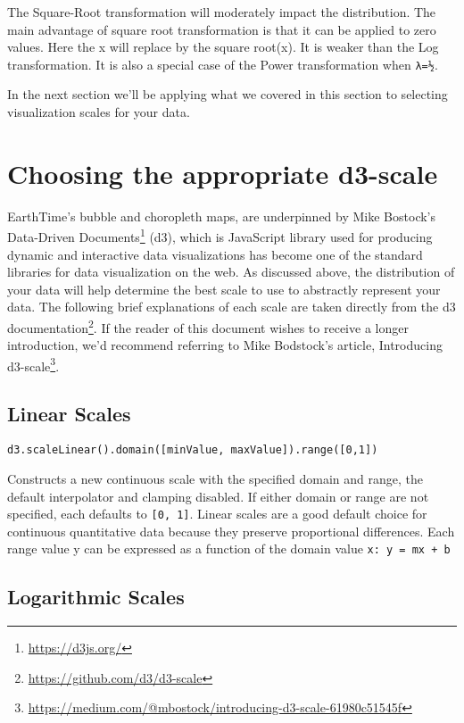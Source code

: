 \documentclass[
]{book}
\renewcommand{\href}[2]{#2\footnote{\url{#1}}}
\begin{document}
The Square-Root transformation will moderately impact the distribution. The main advantage of square root transformation is that it can be applied to zero values. Here the x will replace by the square root(x). It is weaker than the Log transformation. It is also a special case of the Power transformation when \texttt{λ=½}.

In the next section we'll be applying what we covered in this section to selecting visualization scales for your data.

\hypertarget{choosing-the-appropriate-d3-scale}{%
\section{Choosing the appropriate d3-scale}\label{choosing-the-appropriate-d3-scale}}

EarthTime's bubble and choropleth maps, are underpinned by Mike Bostock's \href{https://d3js.org/}{Data-Driven Documents} (d3), which is JavaScript library used for producing dynamic and interactive data visualizations has become one of the standard libraries for data visualization on the web. As discussed above, the distribution of your data will help determine the best scale to use to abstractly represent your data. The following brief explanations of each scale are taken directly from the \href{https://github.com/d3/d3-scale}{d3 documentation}. If the reader of this document wishes to receive a longer introduction, we'd recommend referring to Mike Bodstock's article, \href{https://medium.com/@mbostock/introducing-d3-scale-61980c51545f}{Introducing d3-scale}.

\hypertarget{linear-scales}{%
\subsection*{Linear Scales}\label{linear-scales}}


\texttt{d3.scaleLinear().domain({[}minValue,\ maxValue{]}).range({[}0,1{]})}

Constructs a new continuous scale with the specified domain and range, the default interpolator and clamping disabled. If either domain or range are not specified, each defaults to \texttt{{[}0,\ 1{]}}. Linear scales are a good default choice for continuous quantitative data because they preserve proportional differences. Each range value y can be expressed as a function of the domain value \texttt{x:\ y\ =\ mx\ +\ b}

\hypertarget{logarithmic-scales}{%
\subsection*{Logarithmic Scales}\label{logarithmic-scales}}
\end{document}
